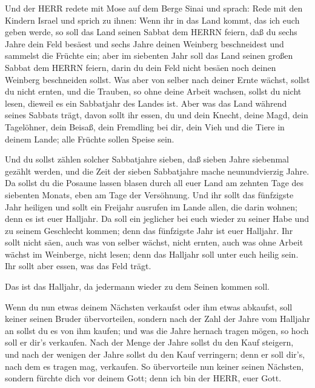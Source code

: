  Und der HERR redete mit Mose auf dem Berge Sinai und
sprach:  Rede mit den Kindern Israel und sprich zu ihnen:
Wenn ihr in das Land kommt, das ich euch geben werde, so soll das Land
seinen Sabbat dem HERRN feiern,  daß du sechs Jahre dein
Feld besäest und sechs Jahre deinen Weinberg beschneidest und sammelst
die Früchte ein;  aber im siebenten Jahr soll das Land
seinen großen Sabbat dem HERRN feiern, darin du dein Feld nicht besäen
noch deinen Weinberg beschneiden sollst.  Was aber von
selber nach deiner Ernte wächst, sollst du nicht ernten, und die
Trauben, so ohne deine Arbeit wachsen, sollst du nicht lesen, dieweil es
ein Sabbatjahr des Landes ist.  Aber was das Land während
seines Sabbats trägt, davon sollt ihr essen, du und dein Knecht, deine
Magd, dein Tagelöhner, dein Beisaß, dein Fremdling bei dir, 
dein Vieh und die Tiere in deinem Lande; alle Früchte sollen Speise
sein.

 Und du sollst zählen solcher Sabbatjahre sieben, daß sieben
Jahre siebenmal gezählt werden, und die Zeit der sieben Sabbatjahre
mache neunundvierzig Jahre.  Da sollst du die Posaune lassen
blasen durch all euer Land am zehnten Tage des siebenten Monats, eben am
Tage der Versöhnung.  Und ihr sollt das fünfzigste Jahr
heiligen und sollt ein Freijahr ausrufen im Lande allen, die darin
wohnen; denn es ist euer Halljahr. Da soll ein jeglicher bei euch wieder
zu seiner Habe und zu seinem Geschlecht kommen;  denn das
fünfzigste Jahr ist euer Halljahr. Ihr sollt nicht säen, auch was von
selber wächst, nicht ernten, auch was ohne Arbeit wächst im Weinberge,
nicht lesen;  denn das Halljahr soll unter euch heilig
sein. Ihr sollt aber essen, was das Feld trägt.

 Das ist das Halljahr, da jedermann wieder zu dem Seinen
kommen soll.

 Wenn du nun etwas deinem Nächsten verkaufst oder ihm etwas
abkaufst, soll keiner seinen Bruder übervorteilen,  sondern
nach der Zahl der Jahre vom Halljahr an sollst du es von ihm kaufen; und
was die Jahre hernach tragen mögen, so hoch soll er dir's verkaufen.
 Nach der Menge der Jahre sollst du den Kauf steigern, und
nach der wenigen der Jahre sollst du den Kauf verringern; denn er soll
dir's, nach dem es tragen mag, verkaufen.  So übervorteile
nun keiner seinen Nächsten, sondern fürchte dich vor deinem Gott; denn
ich bin der HERR, euer Gott.

